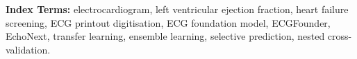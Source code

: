 \textbf{Index Terms:} electrocardiogram, left ventricular ejection fraction, heart failure screening, ECG printout digitisation, ECG foundation model, ECGFounder, EchoNext, transfer learning, ensemble learning, selective prediction, nested cross-validation.
\clearpage
\fancyhead[L]{\nouppercase{\leftmark}}\fancyhead[R]{\thepage}

\renewcommand{\contentsname}{Contents}
\begingroup\setstretch{\liststretch}
\tableofcontents
\clearpage
{}
\listoffigures
\clearpage
{}
\listoftables
\clearpage
\endgroup

\clearpage
\begingroup\setstretch{\liststretch}
\thispagestyle{fancy}
\vspace*{7pt}%
\newcommand{\abbrtable}[1]{\noindent\hspace*{18pt}\begin{tabular}{@{}>{\raggedright\arraybackslash}p{2.6cm}@{\hspace{12pt}}>{\raggedright\arraybackslash}p{\dimexpr\linewidth-18pt-2.6cm-12pt\relax}@{}}#1\end{tabular}\par}
